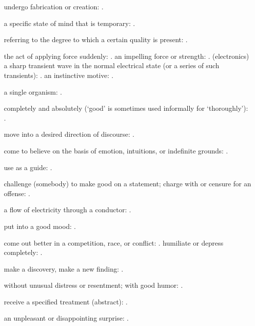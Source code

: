   undergo fabrication or creation: .

  a specific state of mind that is temporary: .

  referring to the degree to which a certain quality is present:   .

  the act of applying force suddenly:   . an impelling force or strength:   . (electronics) a sharp transient wave in the normal electrical state (or a series of such transients):   . an instinctive motive:   .

  a single organism: .

  completely and absolutely (`good' is sometimes used informally for `thoroughly'):   .

  move into a desired direction of discourse:   .

  come to believe on the basis of emotion, intuitions, or indefinite grounds:   .

  use as a guide:   .

  challenge (somebody) to make good on a statement; charge with or censure for an offense: .

  a flow of electricity through a conductor:   .

  put into a good mood:   .

  come out better in a competition, race, or conflict:   . humiliate or depress completely:   .

  make a discovery, make a new finding:   .

  without unusual distress or resentment; with good humor: .

  receive a specified treatment (abstract):   .

  an unpleasant or disappointing surprise:   .

